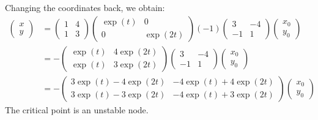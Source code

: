 \documentclass[12pt,letterpaper]{article}
\begin{document}
\begin{enumerate}[label=(\alph*)]
	      Changing the coordinates back, we obtain:
	      \begin{align}
		      \begin{pmatrix}
			      x \\
			      y
		      \end{pmatrix} & =
		      \begin{pmatrix}
			      1 & 4 \\
			      1 & 3
		      \end{pmatrix}
		      \begin{pmatrix}
			      \exp(t) & 0        \\
			      0       & \exp(2t)
		      \end{pmatrix}
		      (-1)\begin{pmatrix}
			      3  & -4 \\
			      -1 & 1
		      \end{pmatrix}
		      \begin{pmatrix}
			      x_0 \\
			      y_0
		      \end{pmatrix} \\
		                                  & =
		      -\begin{pmatrix}
			      \exp(t) & 4\exp(2t) \\
			      \exp(t) & 3\exp(2t)
		      \end{pmatrix}
		      \begin{pmatrix}
			      3  & -4 \\
			      -1 & 1
		      \end{pmatrix}
		      \begin{pmatrix}
			      x_0 \\
			      y_0
		      \end{pmatrix}\\
		                                  & =
		      -\begin{pmatrix}
			      3\exp(t) - 4\exp(2t)  & -4\exp(t) + 4\exp(2t) \\
			      3 \exp(t) -3 \exp(2t) & -4\exp(t) + 3\exp(2t)
		      \end{pmatrix}
		      \begin{pmatrix}
			      x_0 \\
			      y_0
		      \end{pmatrix}
	      \end{align}
	      The critical point is an unstable node.
\end{enumerate}
\end{document}
